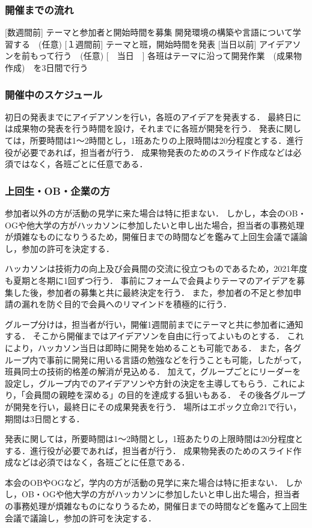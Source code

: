 \subsubsection*{開催までの流れ}
[数週間前]	テーマと参加者と開始時間を募集
           開発環境の構築や言語について学習する　(任意)
[１週間前]	テーマと班，開始時間を発表
[当日以前]	アイデアソンを前もって行う　(任意)
[　当日　]	各班はテーマに沿って開発作業　(成果物作成)　を3日間で行う

\subsubsection*{開催中のスケジュール}
初日の発表までにアイデアソンを行い，各班のアイデアを発表する．
最終日には成果物の発表を行う時間を設け，それまでに各班が開発を行う．
発表に関しては，所要時間は1～2時間とし，1班あたりの上限時間は20分程度とする．進行役が必要であれば，担当者が行う．
成果物発表のためのスライド作成などは必須ではなく，各班ごとに任意である．


\subsubsection*{上回生・OB・企業の方}
参加者以外の方が活動の見学に来た場合は特に拒まない．
しかし，本会のOB・OGや他大学の方がハッカソンに参加したいと申し出た場合，担当者の事務処理が煩雑なものになりうるため，開催日までの時間などを鑑みて上回生会議で議論し，参加の許可を決定する．


ハッカソンは技術力の向上及び会員間の交流に役立つものであるため，2021年度も夏期と冬期に1回ずつ行う．
事前にフォームで会員よりテーマのアイデアを募集した後，参加者の募集と共に最終決定を行う．
また，参加者の不足と参加申請の漏れを防ぐ目的で会員へのリマインドを積極的に行う．


グループ分けは，担当者が行い，開催1週間前までにテーマと共に参加者に通知する．
そこから開催まではアイデアソンを自由に行ってよいものとする．
これにより，ハッカソン当日は即時に開発を始めることも可能である．
また，各グループ内で事前に開発に用いる言語の勉強などを行うことも可能，したがって，班員同士の技術的格差の解消が見込める．
加えて，グループごとにリーダーを設定し，グループ内でのアイデアソンや方針の決定を主導してもらう．これにより，「会員間の親睦を深める」の目的を達成する狙いもある．
その後各グループが開発を行い，最終日にその成果発表を行う．
場所はエポック立命21で行い，期間は3日間とする．

発表に関しては，所要時間は1～2時間とし，1班あたりの上限時間は20分程度とする．進行役が必要であれば，担当者が行う．
成果物発表のためのスライド作成などは必須ではなく，各班ごとに任意である．

本会のOBやOGなど，学内の方が活動の見学に来た場合は特に拒まない．
しかし，OB・OGや他大学の方がハッカソンに参加したいと申し出た場合，担当者の事務処理が煩雑なものになりうるため，開催日までの時間などを鑑みて上回生会議で議論し，参加の許可を決定する．

